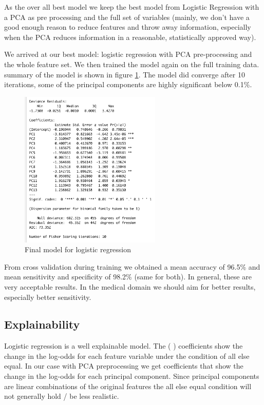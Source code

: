 \documentclass[]{article}
\begin{document}
As the over all best model we keep the best model from Logistic
Regression with a PCA as pre processing and the full set of variables
(mainly, we don't have a good enough reason to reduce features and throw
away information, especially when the PCA reduces information in a
reasonable, statistically approved way).

We arrived at our best model: logistic regression with PCA
pre-processing and the whole feature set. We then trained the model
again on the full training data. summary of the model is shown in figure
\ref{fig:logR-final-model}. The model did converge after 10 iterations,
some of the principal components are highly significant below 0.1\%.

\begin{figure}
    \centering
    \includegraphics[width=0.6\textwidth]{images/logR_final_model.png}
    \caption{Final model for logistic regression}
    \label{fig:logR-final-model}
\end{figure}

From cross validation during training we obtained a mean accuracy of
96.5\% and mean sensitivity and specificity of 98.2\% (same for both).
In general, these are very acceptable results. In the medical domain we
should aim for better results, especially better sensitivity.

\subsection{Explainability}\label{explainability}

Logistic regression is a well explainable model. The ( \beta )
coefficients show the change in the log-odds for each feature variable
under the condition of all else equal. In our case with PCA
preprocessing we get coefficients that show the change in the log-odds
for each principal component. Since principal components are linear
combinations of the original features the all else equal condition will
not generally hold / be less realistic.
\end{document}
